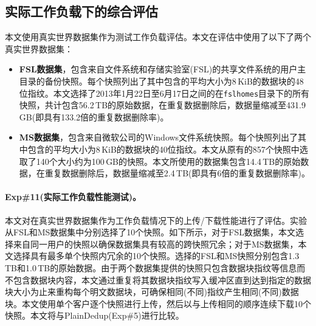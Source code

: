\subsection{实际工作负载下的综合评估}
\label{subsec:sgxdedup-real-world}

本文使用真实世界数据集作为测试工作负载评估\sysnameS。本文在评估中使用了以下了两个真实世界数据集：

\begin{itemize}
    \item \textbf{FSL数据集}，包含来自文件系统和存储实验室(FSL)\cite{fsl,sun16}的共享文件系统的用户主目录的备份快照。每个快照列出了其中包含的平均大小为8\,KiB的数据块的48位指纹。本文选择了2013年1月22日至6月17日之间的在\texttt{fslhomes}目录下的所有快照，共计包含56.2\,TB的原始数据，在重复数据删除后，数据量缩减至431.9\,GB(即具有133.2倍的重复数据删除率)。
    \item \textbf{MS数据集}，包含来自微软公司\cite{meyer2011deduplication}的Windows文件系统快照。每个快照列出了其中包含的平均大小为8\,KiB的数据块的40位指纹。本文从原有的857个快照中选取了140个大小约为100\,GB的快照。本文所使用的数据集包含14.4\,TB的原始数据，在重复数据删除后，数据量缩减至2.4\,TB(即具有6倍的重复数据删除率)。
\end{itemize}

\paragraph*{Exp\#11(实际工作负载性能测试)。} 本文对\sysnameS 在真实世界数据集作为工作负载情况下的上传/下载性能进行了评估。实验从FSL和MS数据集中分别选择了10个快照。如下所示，对于FSL数据集，本文选择来自同一用户的快照以确保数据集具有较高的跨快照冗余；对于MS数据集，本文选择具有最多单个快照内冗余的10个快照。选择的FSL和MS快照分别包含1.3\,TB和1.0\,TB的原始数据。由于两个数据集提供的快照只包含数据块指纹等信息而不包含数据块内容，本文通过重复将其数据块指纹写入缓冲区直到达到指定的数据块大小为止来重构每个明文数据块，可确保相同(不同)指纹产生相同(不同)数据块。本文使用单个客户逐个快照进行上传，然后以与上传相同的顺序连续下载10个快照。本文将\sysnameS 与PlainDedup(Exp\#5)进行比较。

